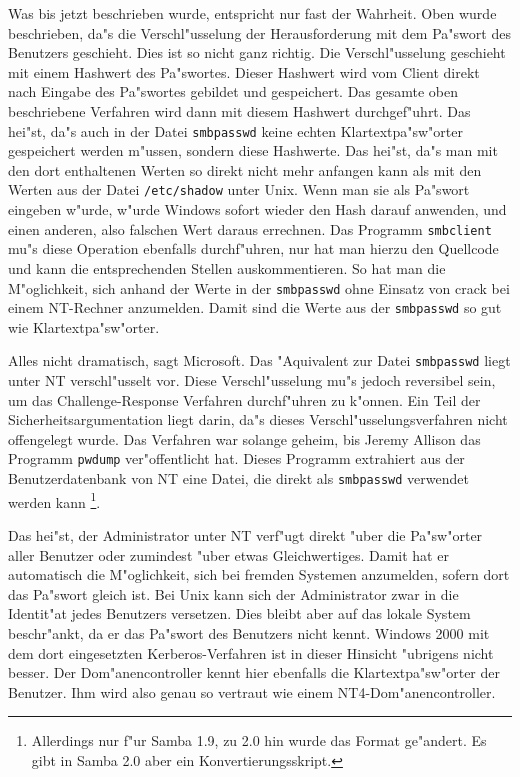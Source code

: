 \documentclass{scrartcl}\usepackage{pslatex}\typearea{12}
\newcommand{\prog}{\texttt}
\newcommand{\dateistyle}{\texttt}
\begin{document}
Was bis jetzt beschrieben wurde, entspricht nur fast der Wahrheit. Oben wurde
beschrieben, da"s die Verschl"usselung der Herausforderung mit dem Pa"swort des
Benutzers geschieht. Dies ist so nicht ganz richtig. Die Verschl"usselung
geschieht mit einem Hashwert des Pa"swortes. Dieser Hashwert wird vom Client
direkt nach Eingabe des Pa"swortes gebildet und gespeichert. Das gesamte oben
beschriebene Verfahren wird dann mit diesem Hashwert durchgef"uhrt. Das hei"st,
da"s auch in der Datei \dateistyle{smbpasswd} keine echten Klartextpa"sw"orter
gespeichert werden m"ussen, sondern diese Hashwerte. Das hei"st, da"s man mit
den dort enthaltenen Werten so direkt nicht mehr anfangen kann als mit den
Werten aus der Datei \dateistyle{/etc/shadow} unter Unix. Wenn man sie als
Pa"swort eingeben w"urde, w"urde Windows sofort wieder den Hash darauf
anwenden, und einen anderen, also falschen Wert daraus errechnen. Das
Programm \prog{smbclient} mu"s diese Operation ebenfalls durchf"uhren, nur
hat man hierzu den Quellcode und kann die entsprechenden Stellen
auskommentieren. So hat man die M"oglichkeit, sich anhand der Werte in der
\dateistyle{smbpasswd} ohne Einsatz von crack bei einem NT-Rechner
anzumelden. Damit sind die Werte aus der \dateistyle{smbpasswd} so gut wie
Klartextpa"sw"orter.

Alles nicht dramatisch, sagt Microsoft. Das "Aquivalent zur Datei
\dateistyle{smbpasswd} liegt unter NT verschl"usselt vor. Diese
Verschl"usselung mu"s jedoch reversibel sein, um das
Challenge-Response Verfahren durchf"uhren zu k"onnen. Ein Teil der
Sicherheitsargumentation liegt darin, da"s dieses
Verschl"usselungsverfahren nicht offengelegt wurde. Das Verfahren war solange
geheim, bis Jeremy Allison das Programm \prog{pwdump} ver"offentlicht hat.
Dieses Programm extrahiert aus der Benutzerdatenbank von NT eine Datei, die
direkt als
\dateistyle{smbpasswd} verwendet werden kann \footnote{Allerdings nur f"ur
Samba 1.9, zu 2.0 hin wurde das Format ge"andert. Es gibt in Samba 2.0 aber
ein Konvertierungsskript.}.

Das hei"st, der Administrator unter NT verf"ugt direkt "uber die
Pa"sw"orter aller Benutzer oder zumindest "uber etwas Gleichwertiges.
Damit hat er automatisch die M"oglichkeit, sich bei fremden Systemen
anzumelden, sofern dort das Pa"swort gleich ist. Bei Unix kann sich
der Administrator zwar in die Identit"at jedes Benutzers versetzen.
Dies bleibt aber auf das lokale System beschr"ankt, da er das Pa"swort
des Benutzers nicht kennt. Windows 2000 mit dem dort eingesetzten
Kerberos-Verfahren ist in dieser Hinsicht "ubrigens nicht besser. Der
Dom"anencontroller kennt hier ebenfalls die Klartextpa"sw"orter der Benutzer.
Ihm wird also genau so vertraut wie einem NT4-Dom"anencontroller.
\end{document}
